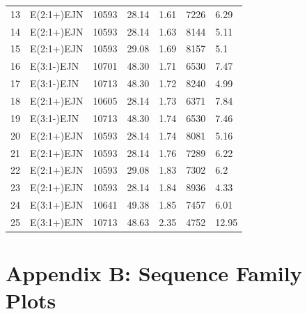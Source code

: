 \documentclass[letterpaper, preprint, paper,11pt]{AAS}	%
\begin{document}
\begin{table}[h!]
\begin{tabular}{lllllll}
    13                 & E(2:1+)EJN        & 10593                 & 28.14       & 1.61        & 7226      & 6.29          \\
    14                 & E(2:1+)EJN        & 10593                 & 28.14       & 1.63        & 8144      & 5.11          \\
    15                 & E(2:1+)EJN        & 10593                 & 29.08       & 1.69        & 8157      & 5.1           \\
    16                 & E(3:1-)EJN        & 10701                 & 48.30       & 1.71        & 6530      & 7.47          \\
    17                 & E(3:1-)EJN        & 10713                 & 48.30       & 1.72        & 8240      & 4.99          \\
    18                 & E(2:1+)EJN        & 10605                 & 28.14       & 1.73        & 6371      & 7.84          \\
    19                 & E(3:1-)EJN        & 10713                 & 48.30       & 1.74        & 6530      & 7.46          \\
    20                 & E(2:1+)EJN        & 10593                 & 28.14       & 1.74        & 8081      & 5.16          \\
    21                 & E(2:1+)EJN        & 10593                 & 28.14       & 1.76        & 7289      & 6.22          \\
    22                 & E(2:1+)EJN        & 10593                 & 29.08       & 1.83        & 7302      & 6.2           \\
    23                 & E(2:1+)EJN        & 10593                 & 28.14       & 1.84        & 8936      & 4.33          \\
    24                 & E(3:1+)EJN        & 10641                 & 49.38       & 1.85        & 7457      & 6.01          \\
    \rowcolor{lightgray}25                 & E(3:1+)EJN        & 10713                 & 48.63       & 2.35        & 4752      & 12.95         \\
    \bottomrule
    \end{tabular}
\end{table}
\fi

\clearpage

\section*{Appendix B: Sequence Family Plots}
\end{document}
